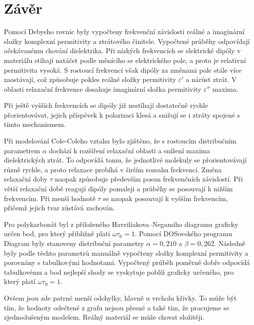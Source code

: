 \documentclass[11pt,a4paper]{article}
\begin{document}
\section{Závěr}

Pomocí Debyeho rovnic byly vypočteny frekvenční závislosti
reálné a imaginární složky komplexní permitivity a ztrátového
činitele. Vypočtené průběhy odpovídají očekávanému chování
dielektrika. Při nízkých frekvencích se elektrické dipóly
v materiálu stíhají natáčet podle měnícího se elektrického
pole, a proto je relativní permitivita vysoká. S rostoucí
frekvencí však dipóly za změnami pole stále více zaostávají,
což způsobuje pokles reálné složky permitivity $\varepsilon'$
a nárůst ztrát. V oblasti relaxační frekvence
dosahuje imaginární složka permitivity $\varepsilon''$ maxima.

Při ještě vyšších frekvencích se dipóly již nestíhají
dostatečně rychle přorientovávat, jejich příspěvek
k polarizaci klesá a snižují se i ztráty spojené
s tímto mechanismem.

Při modelování Cole-Coleho vztahu bylo zjištěno, že
s rostoucím distribučním parametrem $\alpha$ dochází
k rozšíření relaxační oblasti a snížení maxima
dielektrických ztrát. To odpovídá tomu, že jednotlivé molekuly se přorientovávají různě rychle,
a proto relaxace probíhá v širším rozsahu frekvencí.
Změna relaxační doby $\tau$ naopak způsobuje především
posun frekvenčních závislostí. Při větší relaxační
době reagují dipóly pomaleji a průběhy se posouvají k nižším frekvencím.
Při menší hodnotě $\tau$ se naopak posouvají
k vyšším frekvencím, přičemž jejich tvar
zůstává zachován.

Pro polykarbonát byl z přiloženého Havriliakova--Negamiho diagramu
graficky určen bod, pro který přibližně platí
$\omega\tau_0=1$. Pomocí DOSovského programu Diagram byly
stanoveny distribuční parametry $\alpha=0{,}210$
a $\beta=0{,}262$. Následně byly podle těchto
parametrů manuálně vypočteny složky komplexní
permitivity a porovnány s tabulkovými hodnotami.
Vypočtený průběh poměrně dobře odpovídá tabulkovému a bod nejlepší 
shody se vyskytuje poblíž graficky určeného, pro který platí $\omega\tau_0=1$. 

Ovšem jsou zde patrné menší odchylky, hlavně u vrcholu křivky.
To může být tím, že hodnoty odečtené z grafu nejsou přesné a také tím, 
že pracujeme se zjednodušeným modelem. Reálný materiál se může chovat složitěji.
\end{document}
